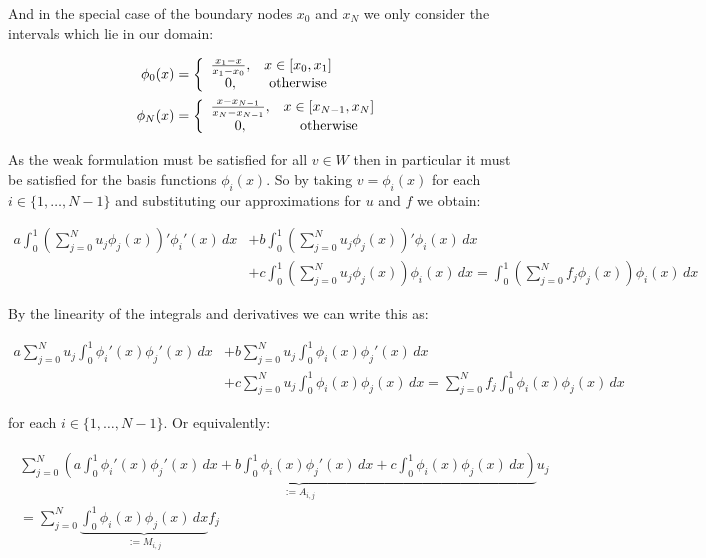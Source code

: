 And in the special case of the boundary nodes $x_0$ and $x_N$ we only consider
the intervals which lie in our domain:

\begin{align}
    \phi_0(x) &= \left\{\begin{array}{c c}
                    \frac{x_1 - x}{x_1 - x_0}, & x \in [x_0, x_1] \\
                    0, & \text{otherwise}
    \end{array}\right.
    \\
    \phi_N(x) &= \left\{\begin{array}{c c}
                    \frac{x - x_{N - 1}}{x_N - x_{N-1}}, & x \in [x_{N-1}, x_N] \\
                    0, & \text{otherwise}
    \end{array}\right.
\end{align}

As the weak formulation  must be satisfied for
all $v \in W$ then in particular it must be satisfied for the basis functions
$\phi_i(x)$. So by taking $v = \phi_i(x)$ for each $i \in \{1,\ldots,N-1\}$ and
substituting our approximations for $u$ and $f$ we obtain:

\begin{align*}
    a\int_0^1{\left(\sum_{j = 0}^N{u_j\phi_j(x)}\right)'\phi_i'(x)\, dx}
    &+b\int_0^1{\left(\sum_{j = 0}^N{u_j\phi_j(x)}\right)'\phi_i(x)\, dx} \\
    &+c\int_0^1{\left(\sum_{j = 0}^N{u_j\phi_j(x)}\right)\phi_i(x)\, dx} =
    \int_0^1{\left(\sum_{j = 0}^Nf_j\phi_j(x)\right)\phi_i(x)\, dx}
\end{align*}

By the linearity of the integrals and derivatives we can write this as:

\begin{align*}
    a\sum_{j = 0}^Nu_j\int_0^1\phi_i'(x)\phi_j'(x)\, dx
    &+b\sum_{j = 0}^Nu_j\int_0^1\phi_i(x)\phi_j'(x)\, dx \\
    &+c\sum_{j = 0}^Nu_j\int_0^1\phi_i(x)\phi_j(x)\, dx =
    \sum_{j = 0}^Nf_j\int_0^1\phi_i(x)\phi_j(x)\, dx
\end{align*}

for each $i \in \{1,\ldots,N-1\}$. Or equivalently:

\begin{align}\label{eq:oned-deterministic-discrete}
  \begin{split}
    \sum_{j = 0}^N\underbrace{\left(a\int_0^1\phi_i'(x)\phi_j'(x)\, dx
        + b\int_0^1\phi_i(x)\phi_j'(x)\, dx + c\int_0^1\phi_i(x)\phi_j(x)\, dx\right)}_{:= A_{i,j}}u_j  \\
    = \sum_{j = 0}^N\underbrace{\int_0^1{\phi_i(x)\phi_j(x)}\, dx}_{:= M_{i,j}}f_j
  \end{split}
\end{align}

